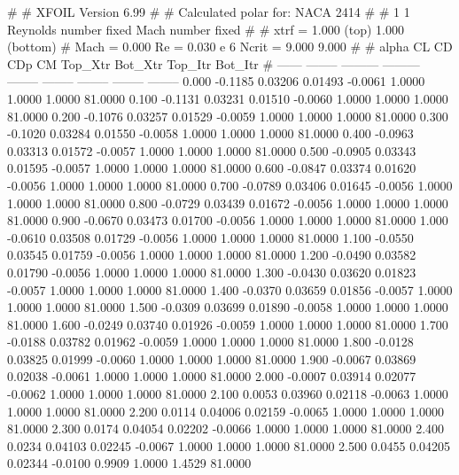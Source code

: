 #  
#       XFOIL         Version 6.99
#  
# Calculated polar for: NACA 2414                                       
#  
# 1 1 Reynolds number fixed          Mach number fixed         
#  
# xtrf =   1.000 (top)        1.000 (bottom)  
# Mach =   0.000     Re =     0.030 e 6     Ncrit =   9.000  9.000
#  
#   alpha    CL        CD       CDp       CM     Top_Xtr  Bot_Xtr  Top_Itr  Bot_Itr
#  ------ -------- --------- --------- -------- -------- -------- -------- --------
   0.000  -0.1185   0.03206   0.01493  -0.0061   1.0000   1.0000   1.0000  81.0000
   0.100  -0.1131   0.03231   0.01510  -0.0060   1.0000   1.0000   1.0000  81.0000
   0.200  -0.1076   0.03257   0.01529  -0.0059   1.0000   1.0000   1.0000  81.0000
   0.300  -0.1020   0.03284   0.01550  -0.0058   1.0000   1.0000   1.0000  81.0000
   0.400  -0.0963   0.03313   0.01572  -0.0057   1.0000   1.0000   1.0000  81.0000
   0.500  -0.0905   0.03343   0.01595  -0.0057   1.0000   1.0000   1.0000  81.0000
   0.600  -0.0847   0.03374   0.01620  -0.0056   1.0000   1.0000   1.0000  81.0000
   0.700  -0.0789   0.03406   0.01645  -0.0056   1.0000   1.0000   1.0000  81.0000
   0.800  -0.0729   0.03439   0.01672  -0.0056   1.0000   1.0000   1.0000  81.0000
   0.900  -0.0670   0.03473   0.01700  -0.0056   1.0000   1.0000   1.0000  81.0000
   1.000  -0.0610   0.03508   0.01729  -0.0056   1.0000   1.0000   1.0000  81.0000
   1.100  -0.0550   0.03545   0.01759  -0.0056   1.0000   1.0000   1.0000  81.0000
   1.200  -0.0490   0.03582   0.01790  -0.0056   1.0000   1.0000   1.0000  81.0000
   1.300  -0.0430   0.03620   0.01823  -0.0057   1.0000   1.0000   1.0000  81.0000
   1.400  -0.0370   0.03659   0.01856  -0.0057   1.0000   1.0000   1.0000  81.0000
   1.500  -0.0309   0.03699   0.01890  -0.0058   1.0000   1.0000   1.0000  81.0000
   1.600  -0.0249   0.03740   0.01926  -0.0059   1.0000   1.0000   1.0000  81.0000
   1.700  -0.0188   0.03782   0.01962  -0.0059   1.0000   1.0000   1.0000  81.0000
   1.800  -0.0128   0.03825   0.01999  -0.0060   1.0000   1.0000   1.0000  81.0000
   1.900  -0.0067   0.03869   0.02038  -0.0061   1.0000   1.0000   1.0000  81.0000
   2.000  -0.0007   0.03914   0.02077  -0.0062   1.0000   1.0000   1.0000  81.0000
   2.100   0.0053   0.03960   0.02118  -0.0063   1.0000   1.0000   1.0000  81.0000
   2.200   0.0114   0.04006   0.02159  -0.0065   1.0000   1.0000   1.0000  81.0000
   2.300   0.0174   0.04054   0.02202  -0.0066   1.0000   1.0000   1.0000  81.0000
   2.400   0.0234   0.04103   0.02245  -0.0067   1.0000   1.0000   1.0000  81.0000
   2.500   0.0455   0.04205   0.02344  -0.0100   0.9909   1.0000   1.4529  81.0000
